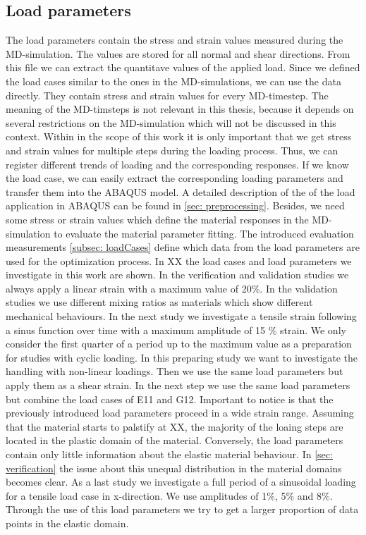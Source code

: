     \subsection{Load parameters}\label{subsec:loadParameters}
    The load parameters contain the stress and strain values measured during the MD-simulation. The values are stored for all normal and shear directions. From this file we can extract the quantitave values of the applied load. Since we defined the load cases similar to the ones in the MD-simulations, we can use the data directly. They contain stress and strain values for every MD-timestep. The meaning of the MD-timsteps is not relevant in this thesis, because it depends on several restrictions on the MD-simulation which will not be discussed in this context. Within in the scope of this work it is only important that we get stress and strain values for multiple steps during the loading process. Thus, we can register different trends of loading and the corresponding responses. If we know the load case, we can easily extract the corresponding loading parameters and transfer them into the ABAQUS model. A detailed description of the of the load application in ABAQUS can be found in \autoref{sec: preprocessing}. Besides, we need some stress or strain values which define the material responses in the MD-simulation to evaluate the material parameter fitting. The introduced evaluation measurements \autoref{subsec: loadCases} define which data from the load parameters are used for the optimization process. In XX the load cases and load parameters we investigate in this work are shown.
    In the verification and validation studies we always apply a linear strain with a maximum value of 20\%. In the validation studies we use different mixing ratios as materials which show different mechanical behaviours. In the next study we investigate a tensile strain following a sinus function over time with a maximum amplitude of 15 \(\%\) strain. We only consider the first quarter of a period up to the maximum value as a preparation for studies with cyclic loading. In this preparing study we want to investigate the handling with non-linear loadings. Then we use the same load parameters but apply them as a shear strain. In the next step we use the same load parameters but combine the load cases of E11 and G12. Important to notice is that the previously introduced load parameters proceed in a wide strain range. Assuming that the material starts to palstify at XX, the majority of the loaing steps are located in the plastic domain of the material. Conversely, the load parameters contain only little information about the elastic material behaviour. In \autoref{sec: verification} the issue about this unequal distribution in the material domains becomes clear.    
    As a last study we investigate  a full period of a sinusoidal loading for a tensile load case in x-direction. We use amplitudes of 1\(\%\), 5\(\%\) and 8\(\%\). Through the use of this load parameters we try to get a larger proportion of data points in the elastic domain.



